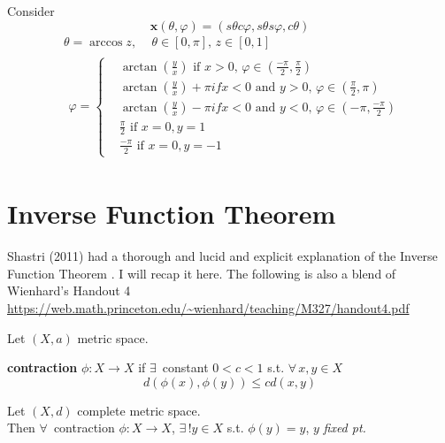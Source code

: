 Consider 
\[
\mathbf{x}(\theta, \varphi) = (s\theta c\varphi, s\theta s\varphi, c\theta)
\]
\[
\begin{aligned}
& \theta = \arccos{z}, \quad \, \theta \in [0, \pi] , \, z \in [0,1] \\
& \begin{gathered}
\varphi = \begin{cases}
	& \arctan{ \left( \frac{y}{x} \right) } \text{ if } x > 0, \, \varphi \in ( \frac{-\pi}{2}, \frac{\pi}{2}) \\
	& \arctan{ \left( \frac{y}{x} \right) }  + \pi if x < 0 \text{ and } y > 0, \, \varphi \in (\frac{\pi}{2}, \pi) \\
	& \arctan{ \left( \frac{y}{x} \right) }  - \pi if x < 0 \text{ and } y < 0, \, \varphi \in (-\pi, \frac{-\pi}{2}) \\ 
	& \frac{\pi}{2} \text{ if } x = 0, y = 1\\
	& \frac{-\pi}{2} \text{ if } x= 0 , y = -1
\end{cases}	
\end{gathered}
\end{aligned}
\]


\section{Inverse Function Theorem}

Shastri (2011) had a thorough and lucid and explicit explanation of the Inverse Function Theorem \cite{dgdt:AShastri2011}.  I will recap it here.  The following is also a blend of Wienhard's Handout 4 \url{https://web.math.princeton.edu/~wienhard/teaching/M327/handout4.pdf}

\begin{definition}
  Let $(X,a)$ metric space.  

\textbf{contraction} $\phi:X \to X$ if $\exists \, $ constant $0<c<1$ s.t. $\forall \, x,y \in X$
\[
d(\phi(x),\phi(y)) \leq cd(x,y)
\]
\end{definition}

\begin{theorem}
  Let $(X,d)$ complete metric space.  \\
Then $\forall \, $ contraction $\phi:X\to X$, $\exists \, ! y\in X$ s.t. $\phi(y) = y$, $y$ \emph{fixed pt.}
\end{theorem}


